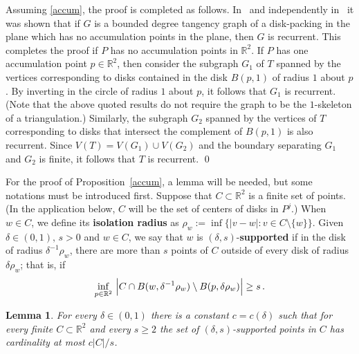 \documentclass[12pt,naturalnames]{article}
\numberwithin{equation}{section}
\numberwithin{figure}{section}
\numberwithin{theorem}{section}
\newtheorem{lemma}[theorem]{Lemma}
\newcommand{\R}{\mathbb{R}}
\def\proofcont#1{{ \medbreak \noindent {\bf Proof of #1, continued.} }}
\def\McCaughan{MR99b:52041}
\def\HStype{MR96h:52017}
\begin{document}
\proofcont{Proposition \ref{triang}}
  Assuming \ref{accum}, the proof is completed as follows.
In~\cite[Thms.~2.6, 3.1.(1), 8.1]{\HStype}
and independently in~\cite{\McCaughan} it was shown that
if $G$ is a bounded degree tangency graph of a disk-packing
in the plane which has no accumulation points in the plane,
then $G$ is recurrent.
This completes the proof if $P$ has no accumulation points in $\R^2$.
If $P$ has one accumulation point $p\in\R^2$,
then consider the subgraph $G_1$ of $T$ spanned by the vertices
corresponding to disks contained in the disk $B(p,1)$ of radius $1$
about $p$.  By inverting in the circle of radius $1$ about $p$,
it follows that $G_1$ is recurrent.  (Note
that the above quoted results do not require the graph to be
the $1$-skeleton of a triangulation.) 
Similarly, the subgraph $G_2$
spanned by the vertices of $T$ corresponding to disks that
intersect the complement of $B(p,1)$ is also recurrent.
Since $V(T)=V(G_1)\cup V(G_2)$ and the boundary
separating $G_1$ and $G_2$ is finite,
it follows that $T$ is recurrent.
% 
\qed
\bigskip

For the proof of Proposition~\ref{accum}, a lemma will be
needed, but some notations must be introduced first.
Suppose that $C\subset\R^2$ is a finite set of points.
(In the application below, $C$ will be the set of centers
of disks in $P^j$.)
When $w\in C$, we define its {\bf isolation radius} as
$\rho_w:=\inf\bigl\{|v-w|:v\in C\setminus\{w\}\bigr\}$.
Given $\delta\in(0,1),\,s>0$ and $w\in C$, we say that $w$
is $(\delta,s)$-{\bf supported} if
in the disk of radius $\delta^{-1}\rho_w$, there are more than
$s$ points of $C$ outside of every disk
of radius $\delta\rho_w$; that is, if
$$
\inf_{ p\in\R^2}\,\,
\Bigl|C\cap B(w,\delta^{-1} \rho_w)\setminus B(p,\delta\rho_w)
\Bigr|\ge s\,.
$$

\begin{lemma}\label{supported}
For every $\delta\in(0,1)$ there is a constant
$c=c(\delta)$ such that
for every finite $C\subset\R^2$ and every $s \ge 2$ the set
of $(\delta,s)$-supported points in $C$
has cardinality at most $c |C|/s$.
\end{lemma}
\end{document}
